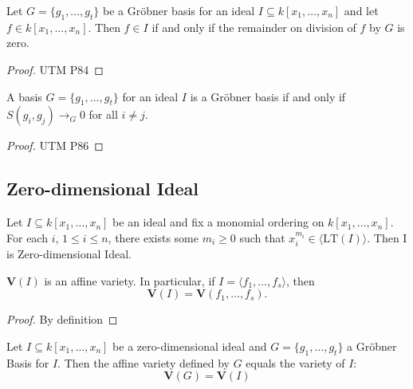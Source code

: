 \begin{lemma}\label{groebner_basis_remainder_zero_iff_mem_span}
  Let \( G = \{g_1, \dots, g_t\} \) be a Gröbner basis for an ideal \( I \subseteq k[x_1, \dots, x_n] \) and let \( f \in k[x_1, \dots, x_n] \). Then \( f \in I \) if and only if the remainder on division of \( f \) by \( G \) is zero.
\end{lemma}
\begin{proof}
  UTM P84
\end{proof}

\begin{lemma}\label{Buchberger Criteria}
A basis \( G = \{ g_1, \ldots, g_t \} \) for an ideal \( I \) is a Gröbner basis if and only if \( S(g_i, g_j) \to_G 0 \) for all \( i \neq j \).
\end{lemma}
\begin{proof}
 UTM P86
\end{proof}

\subsection{Zero-dimensional Ideal}
\begin{lemma}\label{verify_zero_dim_ideal}
  Let \( I \subseteq k[x_1, \ldots, x_n] \) be an ideal and fix a monomial ordering on \( k[x_1, \ldots, x_n] \). For each \( i \), \( 1 \leq i \leq n \), there exists some \( m_i \geq 0 \) such that \( x_i^{m_i} \in \langle \mathrm{LT}(I)\rangle \). Then I is Zero-dimensional Ideal.
\end{lemma}

\begin{lemma}\label{V_I_equal_V_F}
  \( \mathbf{V}(I) \) is an affine variety. In particular, if \( I = \langle f_1, \ldots, f_s \rangle \), then
  \[
  \mathbf{V}(I) = \mathbf{V}(f_1, \ldots, f_s).
  \]
\end{lemma}
\begin{proof}
  By definition
\end{proof}

\begin{lemma}\label{V_G_equal_V_I}
  Let $I \subseteq k[x_1,\ldots,x_n]$ be a zero-dimensional ideal and $G = \{g_1,\ldots,g_t\}$ a Gröbner Basis for $I$. Then the affine variety defined by $G$ equals the variety of $I$:
  \[
  \mathbf{V}(G) = \mathbf{V}(I)
  \]
\end{lemma}
